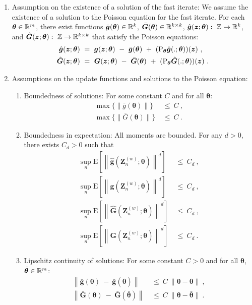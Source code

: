 \documentclass{article}
\newcommand\Bg{\bm{g}}
\newcommand\Bz{\bm{z}}
\newcommand\BG{\bm{G}}
\newcommand\BZ{\bm{Z}}
\newcommand\Bth{\bm{\theta}}
\newcommand{\rE}{\mathrm{E}} \newcommand{\rF}{\mathrm{F}}
\renewcommand{\leq}{\leqslant}
\begin{document}
\begin{enumerate}[label=\textbf{(A\arabic*)}]
\item Assumption on the existence of a solution of the fast iterate:
We assume the existence of a solution to the Poisson equation for
the fast iterate.
For each $\Bth \in \dR^m$, there exist functions
$\bar{\Bg}(\Bth) \in \dR^k$, $\bar{\BG}(\Bth) \in \dR^{k \times k}$,
$\hat{\Bg}(\Bz;\Bth): \ \dZ \to \dR^k$,
and $\hat{\BG}(\Bz;\Bth): \  \dZ \to \dR^{k \times k}$ that satisfy
the Poisson equations:
\begin{align}
\hat{\Bg}(\Bz;\Bth) \ &= \ \Bg(\Bz;\Bth) \ - \ \bar{\Bg}(\Bth) \ + \
(\rP_{\Bth} \hat{\Bg}(.;\Bth))(\Bz) \ , \\
\hat{\BG}(\Bz;\Bth) \ &= \ \BG(\Bz;\Bth) \ - \ \bar{\BG}(\Bth) \ + \
(\rP_{\Bth} \hat{\BG}(.;\Bth))(\Bz) \ .
\end{align}

\item Assumptions on the update functions and solutions to the Poisson
equation:

\begin{enumerate}
\item Boundedness of solutions: For some constant $C$ and for all $\Bth$:
\begin{align}
\max\{ \| \bar{g}(\Bth) \| \} \ &\leq \ C \ , \\
\max\{ \| \bar{G}(\Bth) \| \} \ &\leq \ C \ .
\end{align}
\item Boundedness in expectation: All moments are bounded. For any
  $d>0$, there exists $C_d>0$ such that
\begin{align}
\sup_n \rE \left[\left\| \hat{\Bg}(\BZ^{(w)}_{n};\Bth) \right\|^d \right] \ &\leq \ C_d \ , \\
\sup_n \rE \left[\left\| \Bg(\BZ^{(w)}_{n};\Bth)\right\|^d \right] \ &\leq \ C_d \ , \\
\sup_n \rE \left[\left\| \hat{\BG}(\BZ^{(w)}_{n};\Bth) \right\|^d \right] \ &\leq \ C_d \ , \\
\sup_n \rE \left[\left\| \BG(\BZ^{(w)}_{n};\Bth)\right\|^d \right] \ &\leq \ C_d \ .
\end{align}
\item Lipschitz continuity of solutions:
For some constant $C>0$ and for all $\Bth$,$\bar{\Bth} \in \dR^m$:
\begin{align}
\left\| \bar{\Bg}(\Bth) \ - \
       \bar{\Bg}(\bar{\Bth}) \right\|
\ &\leq \ C \ \| \Bth - \bar{\Bth} \| \ ,\\
\left\| \bar{\BG}(\Bth) \ - \
       \bar{\BG}(\bar{\Bth}) \right\|
\ &\leq \ C \ \| \Bth - \bar{\Bth} \| \ .
\end{align}



\end{enumerate}
\end{enumerate}
\end{document}
